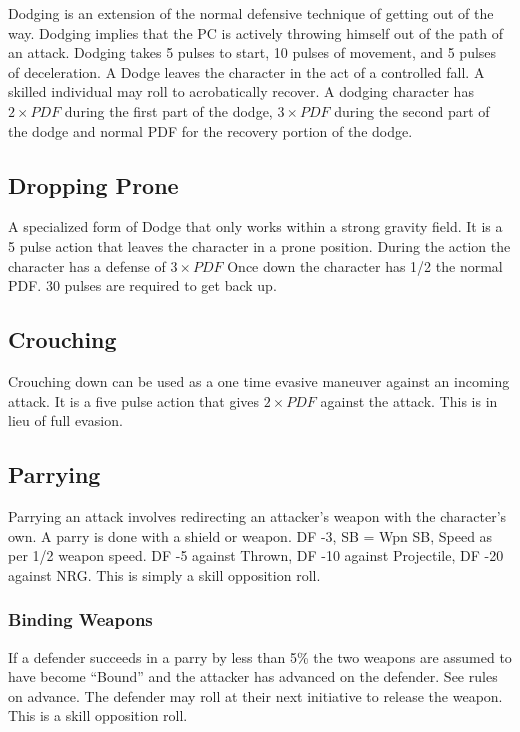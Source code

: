 Dodging is an extension of the normal defensive technique of getting out
of the way. Dodging implies that the PC is actively throwing himself out
of the path of an attack. Dodging takes 5 pulses to start, 10 pulses of movement,
and 5 pulses of deceleration. A Dodge leaves the character in the act of
a controlled fall. A skilled individual may roll to acrobatically recover.
A dodging character has \( 2 \times PDF \) during the first part of the dodge,
\( 3 \times PDF \) during the second part of the dodge and normal PDF for
the recovery portion of the dodge.

\subsection{Dropping Prone}

A specialized form of Dodge that only works within a strong gravity
field. It is a 5 pulse action that leaves the character in a prone
position. During the action the character has a defense of \( 3 \times PDF \)
Once down the character has 1/2 the normal PDF. 30 pulses are required to
get back up.

\subsection{Crouching}

Crouching down can be used as a one time evasive maneuver against an
incoming attack. It is a five pulse action that gives \( 2 \times PDF \)
against the attack. This is in lieu of full evasion.

\subsection{Parrying}

Parrying an attack involves redirecting an attacker's weapon with the
character's own. A parry is done with a shield or weapon. DF -3, SB = Wpn SB,
Speed as per 1/2 weapon speed. DF -5 against Thrown, DF -10 against Projectile,
DF -20 against NRG. This is simply a skill opposition roll.

\subsubsection{Binding Weapons}

If a defender succeeds in a parry by less than 5\% the two weapons are assumed
to have become ``Bound'' and the attacker has advanced on the defender. See rules
on advance. The defender may roll at their next initiative to release the weapon.
This is a skill opposition roll.


